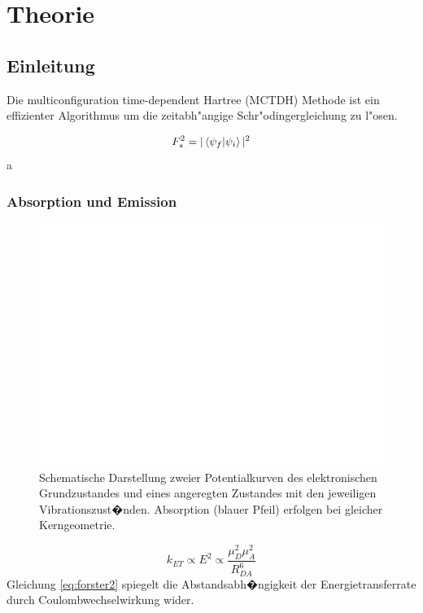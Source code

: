 \chapter{Theorie}

\section{Einleitung}

Die multiconfiguration time-dependent Hartree (MCTDH) Methode ist ein effizienter Algorithmus um die zeitabh"angige Schr"odingergleichung zu l"osen.


 \begin{equation}
 F_{s}^{2}=|\Braket{\psi_{f}}{\psi_{i}}|^{2}
 \label{eq:franck1}
 \end{equation}
a
 \subsection{Absorption und Emission}
 \begin{figure}
\centering
\includegraphics[width=0.7\linewidth]{figures/Franck}
\caption{Schematische Darstellung zweier Potentialkurven des elektronischen Grundzustandes und eines angeregten Zustandes mit den jeweiligen Vibrationszust�nden. Absorption (blauer Pfeil) erfolgen bei gleicher Kerngeometrie.}
\label{fig:Franck}
\end{figure}
 \begin{equation}
k_{ET} \propto E^{2}\propto \frac{\mu_{D}^{2}\mu_{A}^{2}}{R_{DA}^{6}}
\label{eq:forster2}
 \end{equation}
  Gleichung \ref{eq:forster2} spiegelt die Abstandsabh�ngigkeit der Energietransferrate durch Coulombwechselwirkung wider.\cite{turro:1991}
